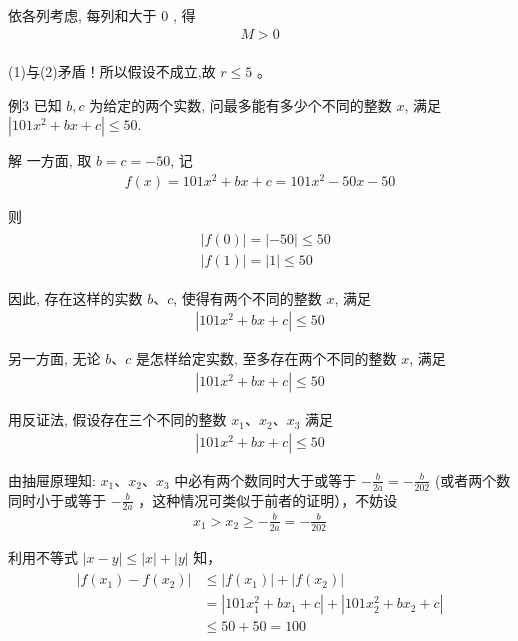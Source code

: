 \documentclass[10pt]{article}
\begin{document}
依各列考虑, 每列和大于 0 , 得\\
\begin{align*}
M>0
\end{align*}\\
(1)与(2)矛盾！所以假设不成立,故 $r \leqslant 5$ 。

例3 已知 $b, c$ 为给定的两个实数, 问最多能有多少个不同的整数 $x$, 满足 $\left|101 x^{2}+b x+c\right| \leqslant 50$.

解 一方面, 取 $b=c=-50$, 记\\
\begin{align*}
f(x)=101 x^{2}+b x+c=101 x^{2}-50 x-50
\end{align*}

则\\
\begin{align*}
\begin{aligned}
& |f(0)|=|-50| \leqslant 50 \\
& |f(1)|=|1| \leqslant 50
\end{aligned}
\end{align*}

因此, 存在这样的实数 $b 、 c$, 使得有两个不同的整数 $x$, 满足\\
\begin{align*}
\left|101 x^{2}+b x+c\right| \leqslant 50
\end{align*}

另一方面, 无论 $b 、 c$ 是怎样给定实数, 至多存在两个不同的整数 $x$, 满足\\
\begin{align*}
\left|101 x^{2}+b x+c\right| \leqslant 50
\end{align*}

用反证法, 假设存在三个不同的整数 $x_{1} 、 x_{2} 、 x_{3}$ 满足\\
\begin{align*}
\left|101 x^{2}+b x+c\right| \leqslant 50
\end{align*}

由抽屉原理知: $x_{1} 、 x_{2} 、 x_{3}$ 中必有两个数同时大于或等于 $-\frac{b}{2 a}=-\frac{b}{202}$ (或者两个数同时小于或等于 $-\frac{b}{2 a}$ ，这种情况可类似于前者的证明），不妨设\\
\begin{align*}
x_{1}>x_{2} \geqslant-\frac{b}{2 a}=-\frac{b}{202}
\end{align*}

利用不等式 $|x-y| \leqslant|x|+|y|$ 知，\\
\begin{align*}
\begin{aligned}
\left|f\left(x_{1}\right)-f\left(x_{2}\right)\right| & \leqslant\left|f\left(x_{1}\right)\right|+\left|f\left(x_{2}\right)\right| \\
& =\left|101 x_{1}^{2}+b x_{1}+c\right|+\left|101 x_{2}^{2}+b x_{2}+c\right| \\
& \leqslant 50+50=100
\end{aligned}
\end{align*}
\end{document}
